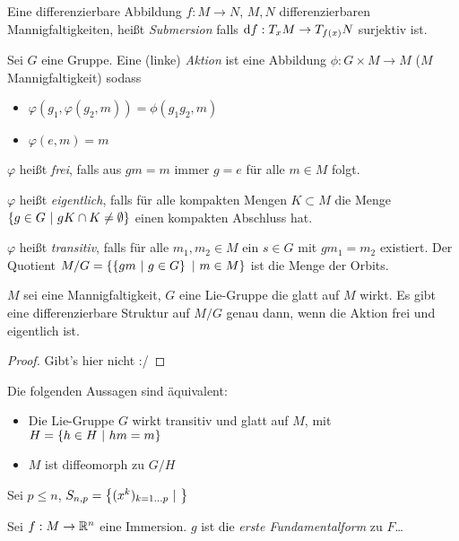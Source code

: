 \documentclass{skript}
\begin{document}
\begin{dfn}
   Eine differenzierbare Abbildung $f : M \to N$, $M,N$ differenzierbaren
   Mannigfaltigkeiten, heißt \emph{Submersion} falls $\mathrm d f : T_x M \to
   T_{f(x)}N$ surjektiv ist.
\end{dfn}

\begin{dfn}
  Sei $G$ eine Gruppe. Eine (linke) \emph{Aktion} ist eine Abbildung $\phi:
  G\times M \to M$ ($M$ Mannigfaltigkeit) sodass
  \begin{itemize}
    \item $\varphi(g_1, \varphi(g_2, m)) = \phi(g_1g_2, m)$
    \item $\varphi(e, m) = m$
  \end{itemize}

  $\varphi$ heißt \emph{frei}, falls aus $gm = m$ immer $g = e$ für alle $m\in
  M$ folgt.

  $\varphi$ heißt \emph{eigentlich}, falls für alle kompakten Mengen
  $K\subset M$ die Menge $\mdef[g\in G]{gK\cap K \neq \emptyset}$ einen
  kompakten Abschluss hat.

  $\varphi$ heißt \emph{transitiv}, falls für alle $m_1, m_2 \in M$ ein $s\in G$
  mit $gm_1 = m_2$ existiert. Der Quotient $M/G = \mdef[\mdef[gm]{g\in G}]{m\in
  M}$ ist die Menge der Orbits.
\end{dfn}

\begin{stz}
  $M$ sei eine Mannigfaltigkeit, $G$ eine Lie-Gruppe die glatt auf $M$ wirkt. Es
  gibt eine differenzierbare Struktur auf $M/G$ genau dann, wenn die Aktion frei
  und eigentlich ist.
  \begin{proof}
    Gibt's hier nicht :/
  \end{proof}
\end{stz}


\begin{stz}
  Die folgenden Aussagen sind äquivalent:
  \begin{itemize}
    \item Die Lie-Gruppe $G$ wirkt transitiv und glatt auf $M$, mit $H =
      \mdef[h\in H]{hm = m}$
    \item $M$ ist diffeomorph zu $G/H$
  \end{itemize}
\end{stz}

\begin{bsp}
  Sei $p\leq n$, $S_{n,p} = \mdef[(x^k)_{k=1\dots p}]{}$
  
\end{bsp}
Sei $f : M \to \mathbb{R}^n$ eine Immersion. $g$ ist die \emph{erste Fundamentalform} zu
$F$\dots
\end{document}
